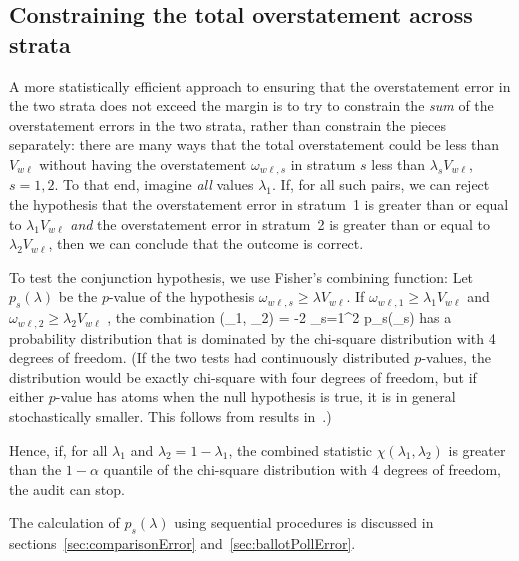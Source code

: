 \subsection{Constraining the total overstatement across strata}
A more statistically efficient approach to ensuring that the overstatement error in the 
two strata does not
exceed the margin is to try to constrain the \emph{sum} of the overstatement errors in the two
strata, rather than constrain the pieces separately:
there are many ways that the total overstatement could be less than $V_{w\ell}$ without
having the overstatement $\omega_{w\ell,s}$
in stratum $s$ less than $\lambda_s V_{w\ell}$, $s = 1, 2$.
To that end, imagine \emph{all} values $\lambda_1$.
If, for all such pairs, we can reject the hypothesis that the 
overstatement error in stratum~1 is greater than or equal to $\lambda_1 V_{w\ell}$ \emph{and} 
the overstatement error in stratum~2 is greater than or equal to $\lambda_2 V_{w\ell}$, then
we can conclude that the outcome is correct.

To test the conjunction hypothesis, we use Fisher's combining function:
Let $p_s(\lambda)$ be the $p$-value of the hypothesis $\omega_{w\ell,s} \ge \lambda V_{w\ell}$.
If  $\omega_{w\ell,1} \ge \lambda_1 V_{w\ell}$ and 
$\omega_{w\ell,2} \ge \lambda_2 V_{w\ell}$ , the combination
\beq
   \chi(\lambda_1, \lambda_2) = -2 \sum_{s=1}^2 \ln p_s(\lambda_s)
\eeq
has a probability distribution that is dominated by the chi-square distribution with 4 degrees
of freedom.
(If the two tests had continuously distributed $p$-values, the distribution would be exactly
chi-square with four degrees of freedom, but if either $p$-value has atoms when
the null hypothesis is true, it is in general stochastically smaller.
This follows from results in~\citep{???}.)

Hence, if, for all $\lambda_1$ and $\lambda_2 = 1- \lambda_1$,
the combined statistic $\chi(\lambda_1, \lambda_2)$ is greater than the 
$1-\alpha$ quantile of the chi-square
distribution with 4 degrees of freedom, the audit can stop.

The calculation of $p_s(\lambda)$ 
using sequential procedures is discussed in 
sections~\ref{sec:comparisonError} and~\ref{sec:ballotPollError}.